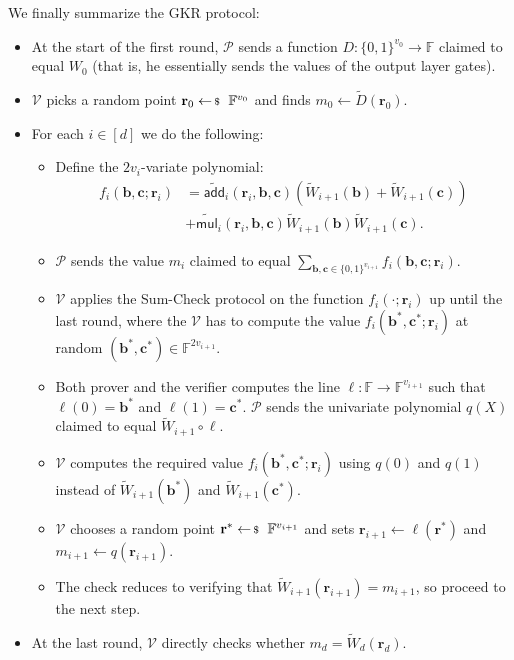 \documentclass[../../book.tex]{subfiles}
\begin{document}
\begin{proposition}
We finally summarize the GKR protocol:
\begin{itemize}
    \item At the start of the first round, $\mathcal{P}$ sends a function 
    $D: \{0,1\}^{v_0} \to \mathbb{F}$ claimed to equal $W_0$ (that is, he 
    essentially sends the values of the output layer gates).
    \item $\mathcal{V}$ picks a random point $\mathbf{r}_0 \leftarrowS
    \mathbb{F}^{v_0}$ and finds $m_0 \gets \widetilde{D}(\mathbf{r}_0)$.
    \item For each $i \in [d]$ we do the following:
    \begin{itemize}
        \item Define the $2v_i$-variate polynomial:
        \begin{align*}
            f_i(\boldsymbol{b}, \boldsymbol{c}; \mathbf{r}_i) &= \widetilde{\mathsf{add}}_i(\mathbf{r}_i, \boldsymbol{b}, \boldsymbol{c})(\widetilde{W}_{i+1}(\boldsymbol{b}) + \widetilde{W}_{i+1}(\boldsymbol{c})) \\
            &+ \widetilde{\mathsf{mul}}_i(\mathbf{r}_i, \boldsymbol{b}, \boldsymbol{c})\widetilde{W}_{i+1}(\boldsymbol{b})\widetilde{W}_{i+1}(\boldsymbol{c}).
        \end{align*}
        \item $\mathcal{P}$ sends the value $m_i$ claimed to equal
        $\sum_{\boldsymbol{b}, \boldsymbol{c} \in
        \{0,1\}^{v_{i+1}}}f_i(\boldsymbol{b}, \boldsymbol{c}; \mathbf{r}_i)$.
        \item $\mathcal{V}$ applies the Sum-Check protocol on the function
        $f_i(\cdot; \mathbf{r}_i)$ up until the last round, where the
        $\mathcal{V}$ has to compute the value $f_i(\boldsymbol{b}^*,
        \boldsymbol{c}^*; \mathbf{r}_i)$ at random $(\boldsymbol{b}^*,
        \boldsymbol{c}^*) \in \mathbb{F}^{2v_{i+1}}$.
        \item Both prover and the verifier computes the line $\ell: \mathbb{F} \to
        \mathbb{F}^{v_{i+1}}$ such that $\ell(0)=\boldsymbol{b}^*$ and
        $\ell(1)=\boldsymbol{c}^*$. $\mathcal{P}$ sends the univariate
        polynomial $q(X)$ claimed to equal $\widetilde{W}_{i+1} \circ \ell$.
        \item $\mathcal{V}$ computes the required value $f_i(\boldsymbol{b}^*,
        \boldsymbol{c}^*; \mathbf{r}_i)$ using $q(0)$ and $q(1)$ instead of 
        $\widetilde{W}_{i+1}(\boldsymbol{b}^*)$ and $\widetilde{W}_{i+1}(\boldsymbol{c}^*)$.
        \item $\mathcal{V}$ chooses a random point $\mathbf{r}^* \leftarrowS
        \mathbb{F}^{v_{i+1}}$ and sets $\mathbf{r}_{i+1} \gets
        \ell(\mathbf{r}^*)$ and $m_{i+1} \gets q(\mathbf{r}_{i+1})$.
        \item The check reduces to verifying that
        $\widetilde{W}_{i+1}(\mathbf{r}_{i+1}) = m_{i+1}$, so proceed to the
        next step.
    \end{itemize}
    \item At the last round, $\mathcal{V}$ directly checks whether
    $m_d=\widetilde{W}_d(\mathbf{r}_d)$.
\end{itemize}
\end{proposition}
\end{document}
